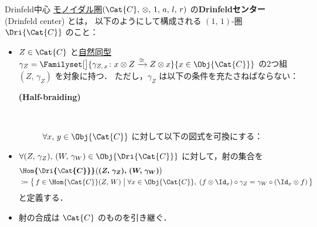 \documentclass[TQFT_main]{subfiles}
\begin{document}
\begin{mydef}[label=def:Drinfeld-center]{Drinfeld中心}
    \hyperref[redef:monoidal-category]{モノイダル圏}$(\Cat{C},\, \otimes,\, 1,\, a,\, l,\, r)$ の\textbf{Drinfeldセンター} (Drinfeld center) とは，
    以下のようにして構成される $(1,\, 1)$-圏 $\Dri{\Cat{C}}$ のこと：
    \begin{itemize}
        \item $Z \in \Cat{C}$ と\hyperref[def:nat]{自然同型} $\gamma_Z = \Familyset[\big]{\gamma_{Z,\, x} \colon x \otimes Z \xrightarrow{\cong} Z \otimes x}{x \in \Obj{\Cat{C}}}$ の2つ組 $(Z,\, \gamma_Z)$ を対象に持つ．
        ただし，$\gamma_Z$ は以下の条件を充たさねばならない：
        \begin{description}
            \item[\textbf{(Half-braiding)}]　
            
            $\forall x,\, y \in \Obj{\Cat{C}}$ に対して以下の図式を可換にする：
            \begin{center}
            \end{center}
        \end{description}
        \item $\forall (Z,\, \gamma_Z),\, (W,\, \gamma_W) \in \Obj{\Dri{\Cat{C}}}$ に対して，射の集合を
        \begin{align}
            &\bm{\Hom{\Dri{\Cat{C}}}} \bm{\bigl( (Z,\, \gamma_Z),\, (W,\, \gamma_W) \bigr)} \\
            &\coloneqq \bigl\{\, f \in \Hom{\Cat{C}}(Z,\, W) \bigm| \forall x \in \Obj{\Cat{C}},\; (f \otimes \Id_x) \circ \gamma_Z = \gamma_W \circ (\Id_x \otimes f) \,\bigr\} 
        \end{align}
        と定義する．
        \item 射の合成は $\Cat{C}$ のものを引き継ぐ．
    \end{itemize}
\end{mydef}
\end{document}

